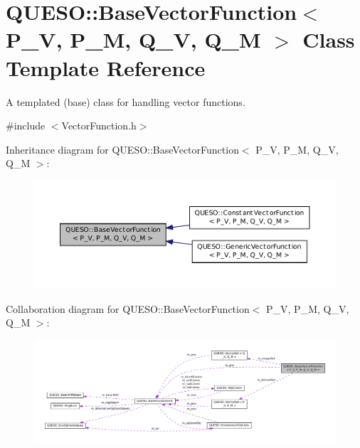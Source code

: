 \hypertarget{class_q_u_e_s_o_1_1_base_vector_function}{\section{Q\-U\-E\-S\-O\-:\-:Base\-Vector\-Function$<$ P\-\_\-\-V, P\-\_\-\-M, Q\-\_\-\-V, Q\-\_\-\-M $>$ Class Template Reference}
\label{class_q_u_e_s_o_1_1_base_vector_function}
}


A templated (base) class for handling vector functions.  




{\ttfamily \#include $<$Vector\-Function.\-h$>$}



Inheritance diagram for Q\-U\-E\-S\-O\-:\-:Base\-Vector\-Function$<$ P\-\_\-\-V, P\-\_\-\-M, Q\-\_\-\-V, Q\-\_\-\-M $>$\-:
\nopagebreak
\begin{figure}[H]
\begin{center}
\leavevmode
\includegraphics[width=350pt]{class_q_u_e_s_o_1_1_base_vector_function__inherit__graph}
\end{center}
\end{figure}


Collaboration diagram for Q\-U\-E\-S\-O\-:\-:Base\-Vector\-Function$<$ P\-\_\-\-V, P\-\_\-\-M, Q\-\_\-\-V, Q\-\_\-\-M $>$\-:
\nopagebreak
\begin{figure}[H]
\begin{center}
\leavevmode
\includegraphics[width=350pt]{class_q_u_e_s_o_1_1_base_vector_function__coll__graph}
\end{center}
\end{figure}
